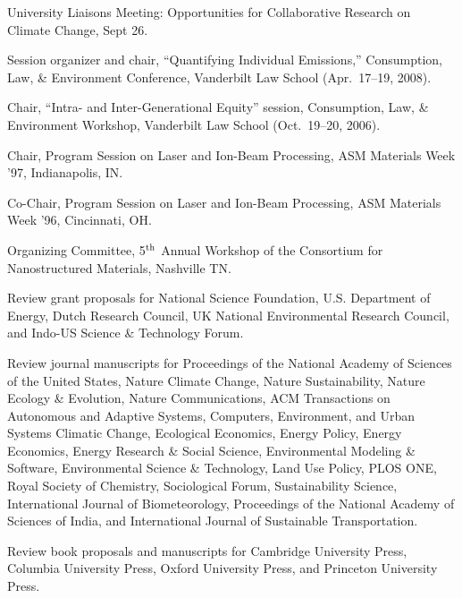   University Liaisons Meeting: Opportunities for Collaborative Research on
  Climate Change, Sept 26.
\item[2008] Session organizer and chair, ``Quantifying Individual Emissions,''
  Consumption, Law, \& Environment Conference, Vanderbilt Law School
  (Apr.\ 17--19, 2008).
\item[2006] Chair, ``Intra- and Inter-Generational Equity'' session,
  Consumption, Law, \& Environment Workshop, Vanderbilt Law School
  (Oct.~19--20, 2006).
\item[1997] Chair, Program Session on Laser and Ion-Beam Processing,
  ASM Materials Week '97, In\-di\-an\-a\-po\-lis, IN.
\item[1996] Co-Chair, Program Session on Laser and Ion-Beam Processing,
  ASM Materials Week '96, Cincinnati, OH.
\item[1996] Organizing Committee,
   5$^{\mbox{\scriptsize th}}$ Annual Workshop of the Consortium for
   Nanostructured Materials, Nashville TN.
\item[Ongoing] Review grant proposals for National Science Foundation,
  U.S. Department of Energy,
  Dutch Research Council,
  UK National Environmental Research Council,
  and Indo-US Science \& Technology Forum.
\item[Ongoing] Review journal manuscripts for
  Proceedings of the National Academy of Sciences of the United States,
  Nature Climate Change,
  Nature Sustainability,
  Nature Ecology \& Evolution,
  Nature Communications,
  ACM Transactions on Autonomous and Adaptive Systems,
  Computers, Environment, and Urban Systems
  Climatic Change,
  Ecological Economics,
  Energy Policy,
  Energy Economics,
  Energy Research \& Social Science,
  Environmental Modeling \& Software,
  Environmental Science \& Technology,
  Land Use Policy,
  PLOS ONE,
  Royal Society of Chemistry,
  Sociological Forum,
  Sustainability Science,
  International Journal of Biometeorology,
  Proceedings of the National Academy of Sciences of India,
  and
  International Journal of Sustainable Transportation.
\item[Ongoing] Review book proposals and manuscripts for
  Cambridge University Press,
  Columbia University Press,
  Oxford University Press,
  and Princeton University Press.
